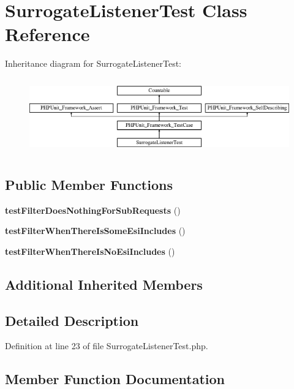 \section{Surrogate\+Listener\+Test Class Reference}
\label{class_symfony_1_1_component_1_1_http_kernel_1_1_tests_1_1_event_listener_1_1_surrogate_listener_test}
Inheritance diagram for Surrogate\+Listener\+Test\+:\begin{figure}[H]
\begin{center}
\leavevmode
\includegraphics[height=3.303835cm]{class_symfony_1_1_component_1_1_http_kernel_1_1_tests_1_1_event_listener_1_1_surrogate_listener_test}
\end{center}
\end{figure}
\subsection*{Public Member Functions}
\begin{DoxyCompactItemize}
\item 
{\bf test\+Filter\+Does\+Nothing\+For\+Sub\+Requests} ()
\item 
{\bf test\+Filter\+When\+There\+Is\+Some\+Esi\+Includes} ()
\item 
{\bf test\+Filter\+When\+There\+Is\+No\+Esi\+Includes} ()
\end{DoxyCompactItemize}
\subsection*{Additional Inherited Members}


\subsection{Detailed Description}


Definition at line 23 of file Surrogate\+Listener\+Test.\+php.



\subsection{Member Function Documentation}
